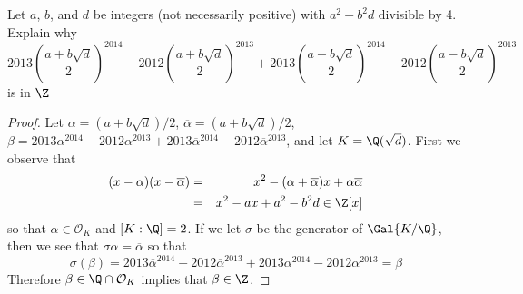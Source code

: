 \documentclass[10pt]{amsart}
\begin{document}
\begin{thm}\label{Ex2}
	Let $a$, $b$, and $d$ be integers (not necessarily positive) with $a^2 - b^2d$ divisible by 4.
	Explain why
	$$2013\left(\frac{a + b\sqrt{d}}{2}\right)^{2014} -2012\left(\frac{a + b\sqrt{d}}{2}\right)^{2013} + 2013\left(\frac{a - b\sqrt{d}}{2}\right)^{2014} - 2012\left(\frac{a - b\sqrt{d}}{2}\right)^{2013}$$
	is in $\Z$

	\begin{proof}
		Let $\alpha = (a + b\sqrt{d})/2$, $\overline{\alpha} = (a + b\sqrt{d})/2$, $\beta = 2013\alpha^{2014} - 2012\alpha^{2013} + 2013\overline{\alpha}^{2014} - 2012\overline{\alpha}^{2013}$, and let $K = \Q(\sqrt{d})$. 
		First we observe that 
		\begin{eqnarray*}
			(x - \alpha)(x - \overline{\alpha}) &=& x^2 - (\alpha + \overline{\alpha})x + \alpha\overline{\alpha}\\
			&=& x^2 - ax + a^2 - b^2d \in \Z[x]
		\end{eqnarray*}
		so that $\alpha \in \mathcal{O}_K$ and $[K : \Q] = 2$.
		If we let $\sigma$ be the generator of $\Gal{K/\Q}$, then we see that $\sigma\alpha = \overline{\alpha}$ so that
		$$\sigma\left(\beta\right) = 2013\overline{\alpha}^{2014} - 2012\overline{\alpha}^{2013} + 2013\alpha^{2014} - 2012\alpha^{2013} = \beta$$
		Therefore $\beta \in \Q \cap \mathcal{O}_K$ implies that $\beta \in \Z$.
	\end{proof}
\end{thm}
\end{document}
